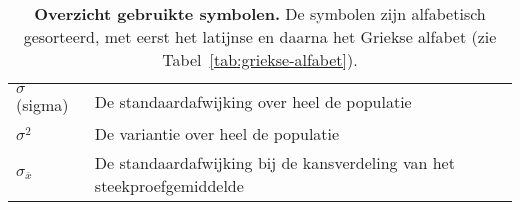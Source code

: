 \begin{table}
\begin{tabular}{p{}p{}}
  	$\sigma$ (sigma)                                        & De standaardafwijking over heel de populatie                                                                                           \\
  	$\sigma^2$                                              & De variantie over heel de populatie                                                                                                    \\
  	$\sigma_{\overline{x}}$                                 & De standaardafwijking bij de kansverdeling van het steekproefgemiddelde                                                                \\
  	\bottomrule
  \end{tabular}
  \caption[Overzicht gebruikte symbolen.]{\textbf{Overzicht gebruikte symbolen.} De symbolen zijn alfabetisch gesorteerd, met eerst het latijnse en daarna het Griekse alfabet (zie Tabel~\ref{tab:griekse-alfabet}).}
  \label{tab:notatie}
\end{table}

